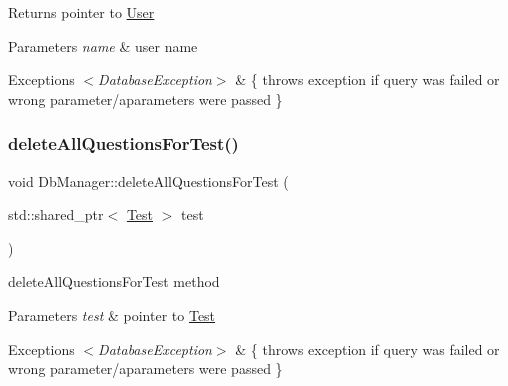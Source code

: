 \begin{DoxyReturn}{Returns}
pointer to \hyperlink{class_user}{User} 
\end{DoxyReturn}

\begin{DoxyParams}{Parameters}
{\em name} & user name \\
\hline
\end{DoxyParams}

\begin{DoxyExceptions}{Exceptions}
{\em $<$\+Database\+Exception$>$} & \{ throws exception if query was failed or wrong parameter/aparameters were passed \} \\
\hline
\end{DoxyExceptions}
\mbox{\label{class_db_manager_a1a68105f460a2c3bde0b8c97749588a9}} 
\subsubsection{\texorpdfstring{delete\+All\+Questions\+For\+Test()}{deleteAllQuestionsForTest()}}
{\footnotesize\ttfamily void Db\+Manager\+::delete\+All\+Questions\+For\+Test (\begin{DoxyParamCaption}\item[{std\+::shared\+\_\+ptr$<$ \hyperlink{class_test}{Test} $>$}]{test }\end{DoxyParamCaption})}



delete\+All\+Questions\+For\+Test method 


\begin{DoxyParams}{Parameters}
{\em test} & pointer to \hyperlink{class_test}{Test} \\
\hline
\end{DoxyParams}

\begin{DoxyExceptions}{Exceptions}
{\em $<$\+Database\+Exception$>$} & \{ throws exception if query was failed or wrong parameter/aparameters were passed \} \\
\hline
\end{DoxyExceptions}
\mbox{\label{class_db_manager_a3fa39305c4949868abcf131fc2dc25b8}} 
